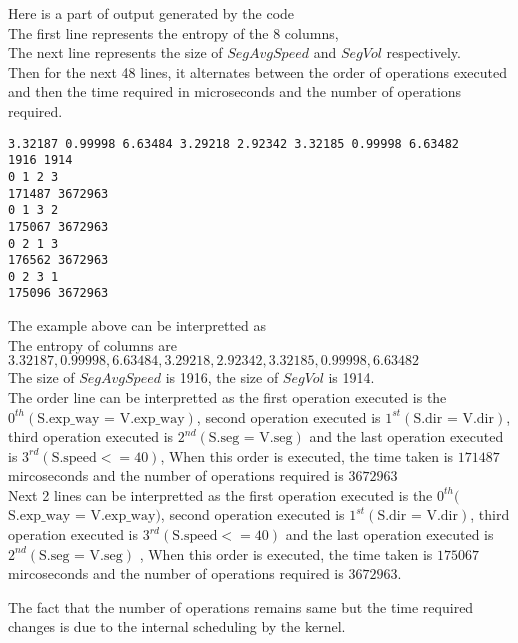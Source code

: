 Here is a part of output generated by the code\\
The first line represents the entropy of the $8$ columns,\\
The next line represents the size of $SegAvgSpeed$ and $SegVol$ respectively.\\
Then for the next 48 lines, it alternates between the order of operations executed and then the time required in microseconds and the number of operations required.\\
\begin{lstlisting}
3.32187 0.99998 6.63484 3.29218 2.92342 3.32185 0.99998 6.63482 
1916 1914
0 1 2 3 
171487 3672963
0 1 3 2 
175067 3672963
0 2 1 3 
176562 3672963
0 2 3 1 
175096 3672963
\end{lstlisting}
The example above can be interpretted as\\
The entropy of columns are $3.32187,0.99998,6.63484,3.29218,2.92342,3.32185,0.99998,6.63482$\\
The size of $SegAvgSpeed$ is 1916, the size of $SegVol$ is 1914.\\
The order line can be interpretted as the first operation executed is the $0^{th}(\text{S.exp\_way = V.exp\_way})$, second operation executed is $1^{st}(\text{S.dir = V.dir})$, third operation executed is $2^{nd}(\text{S.seg = V.seg})$ and the last operation executed is $3^{rd}(\text{S.speed} <= 40)$, When this order is executed, the time taken is $171487$ mircoseconds and the number of operations required is $3672963$\\
Next 2 lines can be interpretted as the first operation executed is the $0^{th}($$\text{S.exp\_way = V.exp\_way})$, second operation executed is $1^{st}(\text{S.dir = V.dir})$, third operation executed is $3^{rd}(\text{S.speed} <= 40)$ and the last operation executed is $2^{nd}(\text{S.seg = V.seg})$ , When this order is executed, the time taken is $175067$ mircoseconds and the number of operations required is $3672963$. 
\par The fact that the number of operations remains same but the time required changes is due to the internal scheduling by the kernel.
